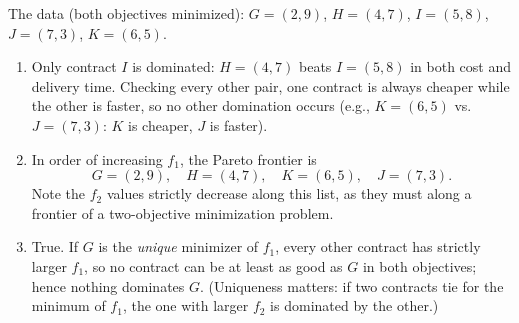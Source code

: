 The data (both objectives minimized):
$G = (2,9)$, $H = (4,7)$, $I = (5,8)$, $J = (7,3)$, $K = (6,5)$.

\begin{enumerate}
\item Only contract $I$ is dominated: $H = (4,7)$ beats $I = (5,8)$ in both
cost and delivery time. Checking every other pair, one contract is always
cheaper while the other is faster, so no other domination occurs (e.g.,
$K = (6,5)$ vs.\ $J = (7,3)$: $K$ is cheaper, $J$ is faster).
\item In order of increasing $f_1$, the Pareto frontier is
\[
G = (2,9), \quad H = (4,7), \quad K = (6,5), \quad J = (7,3).
\]
Note the $f_2$ values strictly decrease along this list, as they must along a
frontier of a two-objective minimization problem.
\item True. If $G$ is the \emph{unique} minimizer of $f_1$, every other
contract has strictly larger $f_1$, so no contract can be at least as good as
$G$ in both objectives; hence nothing dominates $G$. (Uniqueness matters: if
two contracts tie for the minimum of $f_1$, the one with larger $f_2$ is
dominated by the other.)
\end{enumerate}


